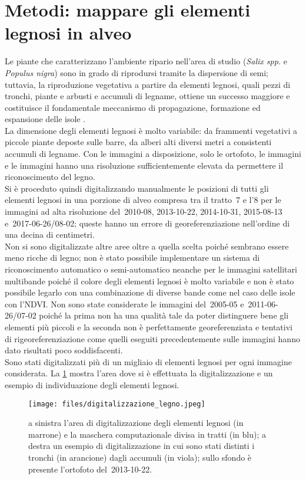 \section{Metodi: mappare gli elementi legnosi in alveo}
Le piante che caratterizzano l'ambiente ripario nell'area di studio (\emph{Salix spp.} e \emph{Populus nigra}) sono in grado di riprodursi tramite la dispersione di semi;
tuttavia, la riproduzione vegetativa a partire da elementi legnosi, quali pezzi di tronchi, piante e arbusti e accumuli di legname, ottiene un successo maggiore e costituisce il fondamentale meccanismo di propagazione, formazione ed espansione delle isole .
\\
La dimensione degli elementi legnosi è molto variabile: da frammenti vegetativi a piccole piante deposte sulle barre, da alberi alti diversi metri a consistenti accumuli di legname.
Con le immagini a disposizione, solo le ortofoto, le immagini \Pl{} e le immagini \WV{} hanno una risoluzione sufficientemente elevata da permettere il riconoscimento del legno.
\\
Si è proceduto quindi digitalizzando manualmente le posizioni di tutti gli elementi legnosi in una porzione di alveo compresa tra il tratto~7 e l'8 per le immagini ad alta risoluzione del~2010-08, 2013-10-22, 2014-10-31, 2015-08-13 e~2017-06-26/08-02; queste hanno un errore di georeferenziazione nell'ordine di una decina di centimetri.
\\
Non si sono digitalizzate altre aree oltre a quella scelta poiché sembrano essere meno ricche di legno; non è stato possibile implementare un sistema di riconoscimento automatico o semi-automatico neanche per le immagini satellitari multibande poiché il colore degli elementi legnosi è molto variabile e non è stato possibile legarlo con una combinazione di diverse bande come nel caso delle isole con l'NDVI.
Non sono state considerate le immagini del~2005-05 e~2011-06-26/07-02 poiché la prima non ha una qualità tale da poter distinguere bene gli elementi più piccoli e la seconda non è perfettamente georeferenziata e tentativi di rigeoreferenziazione come quelli eseguiti precedentemente sulle immagini \AST{} hanno dato risultati poco soddisfacenti.
\\
Sono stati digitalizzati più di un migliaio di elementi legnosi per ogni immagine considerata.
La \cref{fig:digitalizzazione-legno} mostra l'area dove si è effettuata la digitalizzazione e un esempio di individuazione degli elementi legnosi.
%
\begin{figure}
	\centering
	\texttt{[image: files/digitalizzazione\_legno.jpeg]}
	\caption[area di digitalizzazione degli elementi legnosi]{a sinistra l'area di digitalizzazione degli elementi legnosi (in marrone) e la maschera computazionale divisa in tratti (in blu); a destra un esempio di digitalizzazione in cui sono stati distinti i tronchi (in arancione) dagli accumuli (in viola); sullo sfondo è presente l'ortofoto del~2013-10-22.}
	\label{fig:digitalizzazione-legno}
\end{figure}
